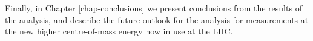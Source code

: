 Finally, in Chapter \ref{chap-conclusions} we present conclusions from the results of the analysis, and describe the future outlook for the analysis for measurements at the new higher centre-of-mass energy now in use at the LHC.



